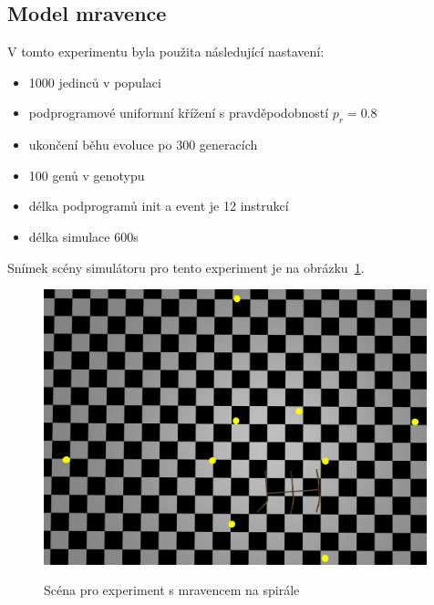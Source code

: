 \subsection{Model mravence}

V tomto experimentu byla použita následující nastavení:
\begin{itemize}
    \item 1000 jedinců v populaci
    \item podprogramové uniformní křížení s pravděpodobností $p_r = 0.8$
    \item ukončení běhu evoluce po 300 generacích
    \item 100 genů v genotypu
    \item délka podprogramů init a event je 12 instrukcí
    \item délka simulace 600s
\end{itemize}

Snímek scény simulátoru pro tento experiment je na obrázku~\ref{fig:mravenec_spirala_zhora}.
\begin{figure}[h]
    \centering
    {\includegraphics[width=30em]{obrazky/mravenec_spirala_zhora.png}}
    \caption{
    Scéna pro experiment s mravencem na spirále
    }
    \label{fig:mravenec_spirala_zhora}
\end{figure}




